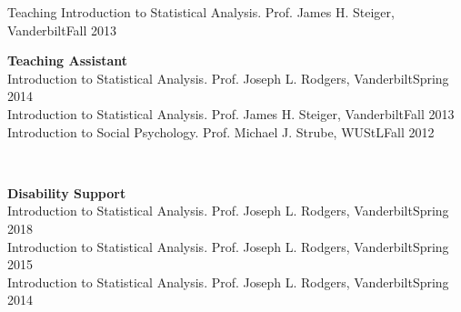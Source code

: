 \begin{rSection}{\textrm{Teaching}}
Introduction to Statistical Analysis. Prof. James H. Steiger, Vanderbilt\hfill{Fall 2013}%
\medskip\\
\begin{minipage}{\linewidth}{\large {\bf Teaching Assistant}}\\
Introduction to Statistical Analysis. Prof. Joseph L. Rodgers, Vanderbilt\hfill  {Spring 2014}\\
Introduction to Statistical Analysis. Prof. James H. Steiger, Vanderbilt\hfill  {Fall 2013}\\
Introduction to Social Psychology. Prof. Michael J. Strube, WUStL\hfill{Fall 2012}\end{minipage}\medskip\\
\begin{minipage}{\linewidth}{\large {\bf Disability Support}}\\
Introduction to Statistical Analysis. Prof. Joseph L. Rodgers, Vanderbilt\hfill  {Spring 2018}\\
Introduction to Statistical Analysis. Prof. Joseph L. Rodgers, Vanderbilt\hfill  {Spring 2015}\\
Introduction to Statistical Analysis. Prof. Joseph L. Rodgers, Vanderbilt\hfill{Spring 2014}\end{minipage}%
\end{rSection}
